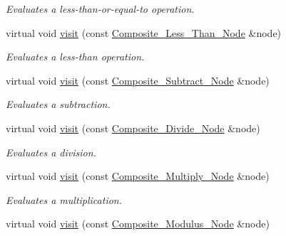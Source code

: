 \begin{DoxyCompactItemize}
\begin{DoxyCompactList}\small\item\em Evaluates a less-\/than-\/or-\/equal-\/to operation. \item\end{DoxyCompactList}\item 
virtual void \hyperlink{classMadara_1_1Expression__Tree_1_1Evaluation__Visitor_ab18210ee3c81c30c079db5dea7f53980}{visit} (const \hyperlink{classMadara_1_1Expression__Tree_1_1Composite__Less__Than__Node}{Composite\_\-Less\_\-Than\_\-Node} \&node)
\begin{DoxyCompactList}\small\item\em Evaluates a less-\/than operation. \item\end{DoxyCompactList}\item 
virtual void \hyperlink{classMadara_1_1Expression__Tree_1_1Evaluation__Visitor_a495cb77e0a45bf903e8a7429e09f5413}{visit} (const \hyperlink{classMadara_1_1Expression__Tree_1_1Composite__Subtract__Node}{Composite\_\-Subtract\_\-Node} \&node)
\begin{DoxyCompactList}\small\item\em Evaluates a subtraction. \item\end{DoxyCompactList}\item 
virtual void \hyperlink{classMadara_1_1Expression__Tree_1_1Evaluation__Visitor_ac259237b3b88024675e3f3cc3b3edc05}{visit} (const \hyperlink{classMadara_1_1Expression__Tree_1_1Composite__Divide__Node}{Composite\_\-Divide\_\-Node} \&node)
\begin{DoxyCompactList}\small\item\em Evaluates a division. \item\end{DoxyCompactList}\item 
virtual void \hyperlink{classMadara_1_1Expression__Tree_1_1Evaluation__Visitor_aa4b7f2b528afd2ce68d9ea9d147cfbe4}{visit} (const \hyperlink{classMadara_1_1Expression__Tree_1_1Composite__Multiply__Node}{Composite\_\-Multiply\_\-Node} \&node)
\begin{DoxyCompactList}\small\item\em Evaluates a multiplication. \item\end{DoxyCompactList}\item 
virtual void \hyperlink{classMadara_1_1Expression__Tree_1_1Evaluation__Visitor_a8453ba6d855c41a6305ecbc3436fa4f7}{visit} (const \hyperlink{classMadara_1_1Expression__Tree_1_1Composite__Modulus__Node}{Composite\_\-Modulus\_\-Node} \&node)

\end{DoxyCompactItemize}
